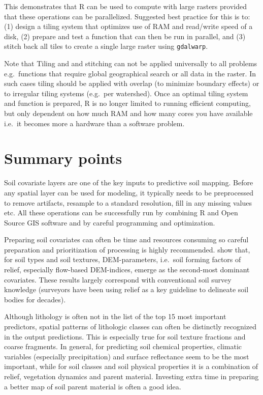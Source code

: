 \documentclass[graybox,natbib,nospthms,UStrade]{svmono}
\begin{document}
This demonstrates that R can be used to compute with large rasters provided that these operations can be parallelized. Suggested best practice for this is to: (1) design a tiling system that optimizes use of RAM and read/write speed of a disk, (2) prepare and test a function that can then be run in parallel, and (3) stitch back all tiles to create a single large raster using \texttt{gdalwarp}.

Note that Tiling and and stitching can not be applied universally to all problems e.g.~functions that require global geographical search or all data in the raster. In such cases tiling should be applied with overlap (to minimize boundary effects) or to irregular tiling systems (e.g.~per watershed). Once an optimal tiling system and function is prepared, R is no longer limited to running efficient computing, but only dependent on how much RAM and how many cores you have available i.e.~it becomes more a hardware than a software problem.

\hypertarget{summary-points-1}{%
\section{Summary points}\label{summary-points-1}}

Soil covariate layers are one of the key inputs to predictive soil mapping.
Before any spatial layer can be used for modeling, it typically needs to be
preprocessed to remove artifacts, resample to a standard resolution, fill in any
missing values etc. All these operations can be successfully run by combining R
and Open Source GIS software and by careful programming and optimization.

Preparing soil covariates can often be time and resources consuming so careful
preparation and prioritization of processing is highly recommended.
\citet{Hengl2017SoilGrids250m} show that, for soil types and soil textures, DEM-parameters,
i.e.~soil forming factors of relief, especially flow-based DEM-indices,
emerge as the second-most dominant covariates. These results largely
correspond with conventional soil survey knowledge (surveyors have been
using relief as a key guideline to delineate soil bodies for decades).

Although lithology is often not in the list of the top 15 most important
predictors, spatial patterns of lithologic classes can often be
distinctly recognized in the output predictions. This is especially true
for soil texture fractions and coarse fragments. In general, for
predicting soil chemical properties, climatic variables (especially
precipitation) and surface reflectance seem to be the most important,
while for soil classes and soil physical properties it is a combination
of relief, vegetation dynamics and parent material. Investing extra time
in preparing a better map of soil parent material is often a good idea.
\end{document}
